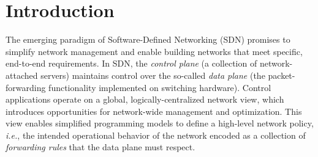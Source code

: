 \documentclass[11pt,pdftex,letter]{article}
\newcommand{\ie}{{\it i.e.}}
\newcommand{\ssnote}[1]{\textcolor{heraldBlue}{\small \bf [SS: #1]}}
\newcommand{\pknote}[1]{\textcolor{heraldBlue}{\small \bf [PK: #1]}}
\newcommand{\ssnote}[1]{}
\newcommand{\pknote}[1]{}
\begin{document}

\newpage
{}\setcounter{page}{1}

\section{Introduction}

The emerging paradigm of Software-Defined Networking (SDN) promises to
simplify network management and enable building networks
that meet specific, end-to-end requirements.
In SDN, the \emph{control plane}  (a collection of network-attached servers)
maintains control over the so-called \emph{data plane} (the
packet-forwarding functionality implemented on switching
hardware). Control applications operate on a global, logically-centralized network view,
which introduces opportunities for network-wide management and optimization.
This view enables simplified programming models to define a high-level
network policy, \ie, the intended operational behavior of the network
encoded as a collection of \emph{forwarding rules} that the data plane must respect.
\end{document}
